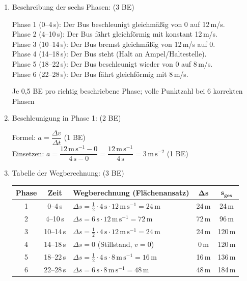 \documentclass[11pt,a4paper]{article}
\newcommand{\lsg}[1]{\textcolor{correct}{#1}}
\newcommand{\be}[1]{\hfill\textcolor{correct}{\small(#1 BE)}}
\begin{document}
\begin{enumerate}
\item[a)] Beschreibung der sechs Phasen: \be{3}

\lsg{Phase 1 (0--4\,s): Der Bus beschleunigt gleichmäßig von 0 auf 12\,m/s.}\\
\lsg{Phase 2 (4--10\,s): Der Bus fährt gleichförmig mit konstant 12\,m/s.}\\
\lsg{Phase 3 (10--14\,s): Der Bus bremst gleichmäßig von 12\,m/s auf 0.}\\
\lsg{Phase 4 (14--18\,s): Der Bus steht (Halt an Ampel/Haltestelle).}\\
\lsg{Phase 5 (18--22\,s): Der Bus beschleunigt wieder von 0 auf 8\,m/s.}\\
\lsg{Phase 6 (22--28\,s): Der Bus fährt gleichförmig mit 8\,m/s.}

{\small\color{correct} Je 0,5 BE pro richtig beschriebene Phase; volle Punktzahl bei 6 korrekten Phasen}

\item[b)] Beschleunigung in Phase 1: \be{2}

\lsg{Formel: $a = \dfrac{\Delta v}{\Delta t}$} \hfill(1 BE)\\[0.2cm]
\lsg{Einsetzen: $a = \dfrac{12\,\mathrm{m\,s^{-1}} - 0}{4\,\mathrm{s} - 0} = \dfrac{12\,\mathrm{m\,s^{-1}}}{4\,\mathrm{s}} = 3\,\mathrm{m\,s^{-2}}$} \hfill(1 BE)

\item[c)] Tabelle der Wegberechnung: \be{3}

\begin{center}
\begin{tabular}{|c|c|l|c|c|}
\hline
\textbf{Phase} & \textbf{Zeit} & \textbf{Wegberechnung (Flächenansatz)} & $\boldsymbol{\Delta s}$ & $\boldsymbol{s_{\textbf{ges}}}$ \\
\hline
1 & 0--4\,s & \lsg{$\Delta s = \frac{1}{2} \cdot 4\,\mathrm{s} \cdot 12\,\mathrm{m\,s^{-1}} = 24\,\mathrm{m}$} & \lsg{24\,m} & \lsg{24\,m} \\
\hline
2 & 4--10\,s & \lsg{$\Delta s = 6\,\mathrm{s} \cdot 12\,\mathrm{m\,s^{-1}} = 72\,\mathrm{m}$} & \lsg{72\,m} & \lsg{96\,m} \\
\hline
3 & 10--14\,s & \lsg{$\Delta s = \frac{1}{2} \cdot 4\,\mathrm{s} \cdot 12\,\mathrm{m\,s^{-1}} = 24\,\mathrm{m}$} & \lsg{24\,m} & \lsg{120\,m} \\
\hline
4 & 14--18\,s & \lsg{$\Delta s = 0$ (Stillstand, $v = 0$)} & \lsg{0\,m} & \lsg{120\,m} \\
\hline
5 & 18--22\,s & \lsg{$\Delta s = \frac{1}{2} \cdot 4\,\mathrm{s} \cdot 8\,\mathrm{m\,s^{-1}} = 16\,\mathrm{m}$} & \lsg{16\,m} & \lsg{136\,m} \\
\hline
6 & 22--28\,s & \lsg{$\Delta s = 6\,\mathrm{s} \cdot 8\,\mathrm{m\,s^{-1}} = 48\,\mathrm{m}$} & \lsg{48\,m} & \lsg{184\,m} \\
\hline
\end{tabular}
\end{center}


\end{enumerate}
\end{document}

